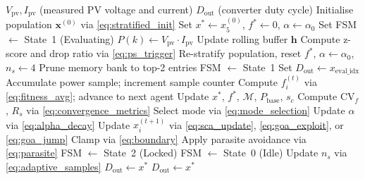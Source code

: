 \documentclass[a4paper, 12pt]{article}
\begin{document}
\begin{algorithm}[t]
\caption{Enhanced SC-GOA for MPPT}
\label{alg:scgoa}
\begin{algorithmic}[1]
\Require $V_{\mathrm{pv}}, I_{\mathrm{pv}}$ (measured PV voltage and current)
\Ensure $D_{\text{out}}$ (converter duty cycle)
\Statex
{}
    \State Initialise population $\mathbf{x}^{(0)}$ via \cref{eq:stratified_init}
    \State Set $x^{*} \leftarrow x_5^{(0)}$, \; $f^{*} \leftarrow 0$, \; $\alpha \leftarrow \alpha_0$
    \State Set FSM $\leftarrow$ State~1 (Evaluating)
\EndIf
\Statex
\State $P(k) \leftarrow V_{\mathrm{pv}} \cdot I_{\mathrm{pv}}$ 
\State Update rolling buffer $\mathbf{h}$
\Statex
{}
    \State Compute z-score and drop ratio via \cref{eq:ps_trigger}
        \State Re-stratify population, reset $f^{*}$, $\alpha \leftarrow \alpha_0$, $n_s \leftarrow 4$
        \State Prune memory bank to top-2 entries
        \State FSM $\leftarrow$ State~1
    \EndIf
\EndIf
\Statex
{}
    \State Set $D_{\text{out}} \leftarrow x_{\text{eval\_idx}}$ 
    \State Accumulate power sample; increment sample counter
        \State Compute $f_i^{(t)}$ via \cref{eq:fitness_avg}; advance to next agent
    \EndIf
        \State Update $x^{*}$, $f^{*}$, $\mathcal{M}$, $P_{\mathrm{base}}$, $s_c$
        \State Compute $\mathrm{CV}_f$, $R_s$ via \cref{eq:convergence_metrics}
        \State Select mode via \cref{eq:mode_selection}
        \State Update $\alpha$ via \cref{eq:alpha_decay}
            \State Update $x_i^{(t+1)}$ via \cref{eq:sca_update}, \cref{eq:goa_exploit}, or \cref{eq:goa_jump}
            \State Clamp via \cref{eq:boundary}
        \EndFor
        \State Apply parasite avoidance via \cref{eq:parasite}
            \State FSM $\leftarrow$ State~2 (Locked)
        \Else
            \State FSM $\leftarrow$ State~0 (Idle)
        \EndIf
        \State Update $n_s$ via \cref{eq:adaptive_samples}
    \EndIf
{}
    \State $D_{\text{out}} \leftarrow x^{*}$ 
\Else
    \State $D_{\text{out}} \leftarrow x^{*}$ 
\EndIf
\end{algorithmic}
\end{algorithm}
\end{document}
